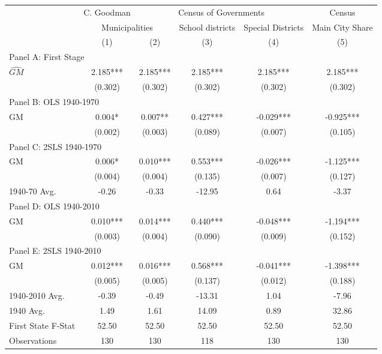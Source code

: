  \begin{tabular}{l*{5}{c}} \toprule \setlength{\tabcolsep}{15pt}
&\multicolumn{1}{c}{C. Goodman}&\multicolumn{3}{c}{Census of Governments}&\multicolumn{1}{c}{Census}\\\cmidrule(lr){2-2}\cmidrule(lr){3-5}\cmidrule(lr){6-6}
&\multicolumn{2}{c}{Municipalities}&\multicolumn{1}{c}{School districts}&\multicolumn{1}{c}{Special Districts}&\multicolumn{1}{c}{Main City Share}\\\cmidrule(lr){2-3}\cmidrule(lr){4-4}\cmidrule(lr){5-5}\cmidrule(lr){6-6}
&\multicolumn{1}{c}{(1)}&\multicolumn{1}{c}{(2)}&\multicolumn{1}{c}{(3)}&\multicolumn{1}{c}{(4)}&\multicolumn{1}{c}{(5)}\\
\cmidrule(lr){1-6}
\multicolumn{5}{l}{Panel A: First Stage}\\
\cmidrule(lr){1-6}
$\widehat{GM}$  &    2.185***&    2.185***&    2.185***&    2.185***&    2.185***\\
                &  (0.302)   &  (0.302)   &  (0.302)   &  (0.302)   &  (0.302)   \\
\cmidrule(lr){1-6}
\multicolumn{5}{l}{Panel B: OLS 1940-1970}\\
\cmidrule(lr){1-6}
GM              &    0.004*  &    0.007** &    0.427***&   -0.029***&   -0.925***\\
                &  (0.002)   &  (0.003)   &  (0.089)   &  (0.007)   &  (0.105)   \\
\cmidrule(lr){1-6}
\multicolumn{5}{l}{Panel C: 2SLS 1940-1970}\\
\cmidrule(lr){1-6}
GM              &    0.006*  &    0.010***&    0.553***&   -0.026***&   -1.125***\\
                &  (0.004)   &  (0.004)   &  (0.135)   &  (0.007)   &  (0.127)   \\
\midrule
1940-70 Avg.    &    -0.26   &    -0.33   &   -12.95   &     0.64   &    -3.37   \\
\cmidrule(lr){1-6}
\multicolumn{5}{l}{Panel D: OLS 1940-2010}\\
\cmidrule(lr){1-6}
GM              &    0.010***&    0.014***&    0.440***&   -0.048***&   -1.194***\\
                &  (0.003)   &  (0.004)   &  (0.090)   &  (0.009)   &  (0.152)   \\
\cmidrule(lr){1-6}
\multicolumn{5}{l}{Panel E: 2SLS 1940-2010}\\
\cmidrule(lr){1-6}
GM              &    0.012***&    0.016***&    0.568***&   -0.041***&   -1.398***\\
                &  (0.005)   &  (0.005)   &  (0.137)   &  (0.012)   &  (0.188)   \\
\cmidrule(lr){1-6}
1940-2010 Avg.  &    -0.39   &    -0.49   &   -13.31   &     1.04   &    -7.96   \\
1940 Avg.       &     1.49   &     1.61   &    14.09   &     0.89   &    32.86   \\
First State F-Stat&    52.50   &    52.50   &    52.50   &    52.50   &    52.50   \\
Observations    &      130   &      130   &      118   &      130   &      130   \\
 \bottomrule \end{tabular}
